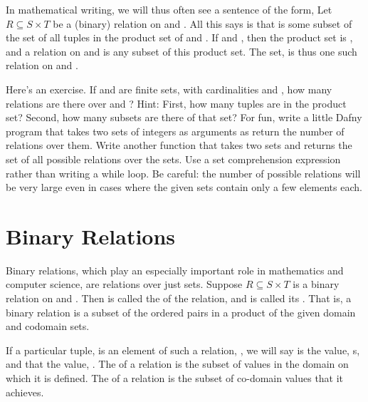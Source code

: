 \documentclass[letterpaper,10pt,english]{sphinxmanual}
\begin{document}
In mathematical writing, we will thus often see a sentence of the
form, Let \(R \subseteq S \times T\) be a (binary) relation on 
and . All this says is that  is some subset of the set of all
tuples in the product set of  and . If  and
, then the product set is , and a relation on  and  is any
subset of this product set.  The set,  is
thus one such relation on  and .

Here’s an exercise. If  and  are finite sets, with cardinalities
 and , how many relations are there over  and
? Hint: First, how many tuples are in the product set? Second, how
many subsets are there of that set? For fun, write a little Dafny
program that takes two sets of integers as arguments as return the
number of relations over them.  Write another function that takes two
sets and returns the set of all possible relations over the sets. Use
a set comprehension expression rather than writing a while loop. Be
careful: the number of possible relations will be very large even in
cases where the given sets contain only a few elements each.


\section{Binary Relations}
\label{\detokenize{08-relations:binary-relations}}
Binary relations, which play an especially important role in
mathematics and computer science, are relations over just 
sets. Suppose \(R \subseteq S \times T\) is a binary relation on
 and . Then  is called the  of the relation, and 
is called its . That is, a binary relation is a subset of
the ordered pairs in a product of the given domain and codomain sets.

If a particular tuple,  is an element of such a relation, ,
we will say  is  the value, s, and that 
the value, . The  of a relation is the subset of values in
the domain on which it is defined. The  of a relation is the
subset of co-domain values that it achieves.
\end{document}
